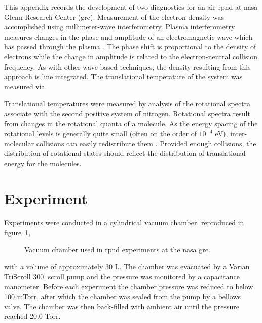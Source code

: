 This appendix records the development of two diagnostics for an air \acs{rpnd}
at \acs{nasa} Glenn Research Center (\acs{grc}). Measurement of the electron
density was accomplished using millimeter-wave interferometry. Plasma
interferometry measures changes in the phase and amplitude of an electromagnetic
wave which has passed through the plasma \cite{Lieberman2005}. The phase shift
is proportional to the density of electrons while the change in amplitude is
related to the electron-neutral collision frequency. As with other wave-based
techniques, the density resulting from this approach is line integrated. The
translational temperature of the system was measured via

Translational temperatures were measured by analysis of the rotational spectra
associate with the second positive system of nitrogen. Rotational spectra result
from changes in the rotational quanta of a molecule. As the energy spacing of
the rotational levels is generally quite small (often on the order of $10^{-4}$
eV), inter-molecular collisions can easily redistribute them
\cite{Herzberg1950}. Provided enough collisions, the distribution of rotational
states should reflect the distribution of translational energy for the
molecules.

\section{Experiment}

Experiments were conducted in a cylindrical vacuum chamber, reproduced in
figure~\ref{fig:nasachamber},
\begin{figure}
  \centering
  \setlength\fboxsep{0pt}
  \setlength\fboxrule{1.0pt}
  \caption{Vacuum chamber used in \acs{rpnd} experiments at the \acs{nasa}
    \acs{grc}.}
  \label{fig:nasachamber}
\end{figure}
with a volume of approximately 30 L. The chamber was evacuated by a Varian
TriScroll 300, scroll pump and the pressure was monitored by a capacitance
manometer. Before each experiment the chamber pressure was reduced to below 100
mTorr, after which the chamber was sealed from the pump by a bellows valve. The
chamber was then back-filled with ambient air until the pressure reached 20.0
Torr.

